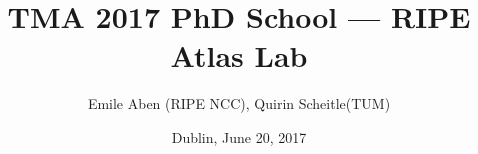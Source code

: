 %
% 
% 
%

\usepackage{soul}
\renewcommand{\PersonTitel}{}
\newcommand{\Datum}{\today}

\renewcommand{\PraesentationFusszeileZusatz}{TMA'17 RIPE Atlas Lab}

\title{TMA 2017 PhD School --- RIPE Atlas Lab}
\author{Emile Aben (RIPE NCC), Quirin Scheitle(TUM)}
\institute[]{\UniversitaetName \\ \FakultaetName}
\date[\Datum]{Dublin, June 20, 2017}
\subject{}
\usepackage{tikz}


\usepackage{xspace}
\usepackage{tikz}
\usepackage{booktabs}

\usepackage{hyperref,xcolor,color,colortbl,graphicx,tabularx}
\usepackage{pgfplots}
\usepackage{multirow}
\usepackage{xspace}
\usepackage{environ}
\usepackage{comment}
\usepackage{subcaption}
\usepackage{subfloat}
\usepackage{textgreek}  %
\usepackage{soul} %
\usepackage{wasysym} %




\newcommand{\packet}[3]{
	\draw[-latex,line width=0.7pt] (#1) to node[above,sloped]{\scriptsize{{#3}}} (#2);}

\newcommand{\dpacket}[3]{
	\draw[latex-latex,line width=0.7pt] (#1) to node[above,sloped]{\scriptsize{{#3}}} (#2);}

\usepackage{tumcolor}




